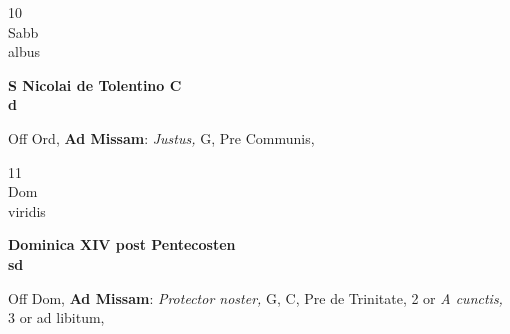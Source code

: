 \documentclass[10pt, openany]{book}
\begin{document}
        \begin{center}
            \begin{minipage}{3.5in}
                \vspace{2em}
                \begin{minipage}{0.5in}
                    {\Huge 10} \\
                    {\normalsize Sabb} \\
                    {\normalsize albus}
                \end{minipage}
                \begin{minipage}{3.0in}
                    \textbf{ \large S Nicolai de Tolentino C \\
                    \textnormal{\normalsize d}} \\ 
                \end{minipage}
                \begin{justify}Off Ord, \textbf{Ad Missam}: \textit{Justus,} G, Pre Communis,  
                \end{justify}
            \end{minipage}
        \end{center}
    
        \begin{center}
            \begin{minipage}{3.5in}
                \vspace{2em}
                \begin{minipage}{0.5in}
                    {\Huge 11} \\
                    {\normalsize Dom} \\
                    {\normalsize viridis}
                \end{minipage}
                \begin{minipage}{3.0in}
                    \textbf{ \large Dominica XIV post Pentecosten \\
                    \textnormal{\normalsize sd}} \\ 
                \end{minipage}
                \begin{justify}Off Dom, \textbf{Ad Missam}: \textit{Protector noster,} G, C, Pre de Trinitate, 2 or \textit{A cunctis,} 3 or ad libitum,  
                \end{justify}
            \end{minipage}
        \end{center}
    
\end{document}
